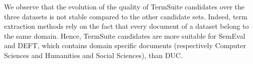       We observe that the evolution of the quality of TermSuite candidates over
      the three datasets is not stable compared to the other candidate sets.
      Indeed, term extraction methods rely on the fact that every document of a
      dataset belong to the same domain. Hence, TermSuite candidates are more
      suitable for SemEval and DEFT, which contains domain specific documents
      (respectively Computer Sciences and Humanities and Social Sciences), than
      DUC.

